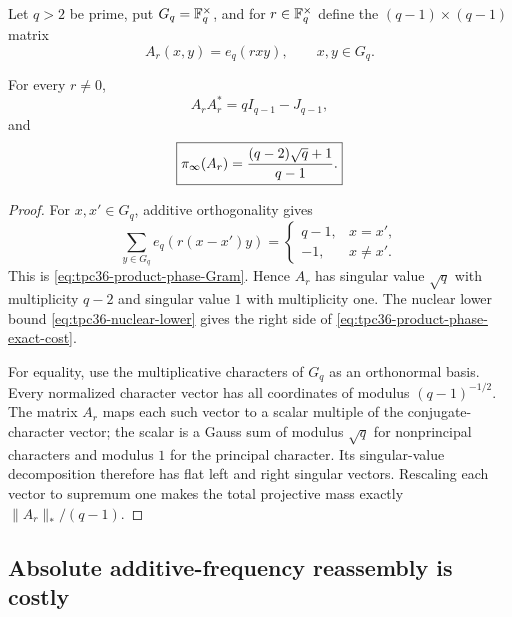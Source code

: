 Let \(q>2\) be prime, put \(G_q=\mathbb F_q^\times\), and for
\(r\in\mathbb F_q^\times\) define the \((q-1)\times(q-1)\) matrix
\begin{equation}
 A_r(x,y)=e_q(rxy),\qquad x,y\in G_q.
 \label{eq:tpc36-product-phase-matrix}
\end{equation}

\begin{theorem}
\label{thm:tpc36-product-phase-norm}
For every \(r\ne0\),
\begin{equation}
 A_rA_r^*=qI_{q-1}-J_{q-1},
 \label{eq:tpc36-product-phase-Gram}
\end{equation}
and
\begin{equation}
 \boxed{
 \pi_{\infty}(A_r)
 =\frac{(q-2)\sqrt q+1}{q-1}.}
 \label{eq:tpc36-product-phase-exact-cost}
\end{equation}
\end{theorem}

\begin{proof}
For \(x,x'\in G_q\), additive orthogonality gives
\begin{equation}
 \sum_{y\in G_q}e_q(r(x-x')y)
 =\begin{cases}
 q-1,&x=x',\\
 -1,&x\ne x'.
 \end{cases}
 \label{eq:tpc36-product-phase-row-inner-product}
\end{equation}
This is \eqref{eq:tpc36-product-phase-Gram}.  Hence \(A_r\) has
singular value \(\sqrt q\) with multiplicity \(q-2\) and singular value
\(1\) with multiplicity one.  The nuclear lower bound
\eqref{eq:tpc36-nuclear-lower} gives the right side of
\eqref{eq:tpc36-product-phase-exact-cost}.

For equality, use the multiplicative characters of \(G_q\) as an
orthonormal basis.  Every normalized character vector has all coordinates
of modulus \((q-1)^{-1/2}\).  The matrix \(A_r\) maps each such vector to a
scalar multiple of the conjugate-character vector; the scalar is a Gauss
sum of modulus \(\sqrt q\) for nonprincipal characters and modulus \(1\)
for the principal character.  Its singular-value decomposition therefore
has flat left and right singular vectors.  Rescaling each vector to
supremum one makes the total projective mass exactly
\(\|A_r\|_* /(q-1)\).
\end{proof}

\subsection{Absolute additive-frequency reassembly is costly}

